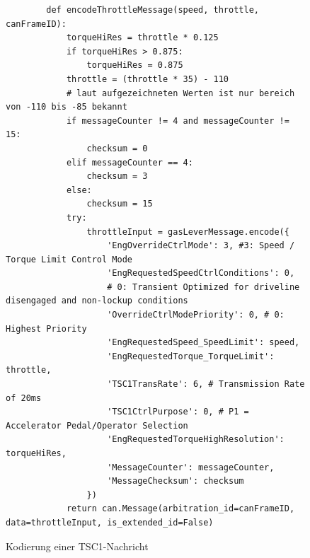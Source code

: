\begin{figure}[H]
    \begin{verbatim}
        def encodeThrottleMessage(speed, throttle, canFrameID):
            torqueHiRes = throttle * 0.125
            if torqueHiRes > 0.875:
                torqueHiRes = 0.875
            throttle = (throttle * 35) - 110 
            # laut aufgezeichneten Werten ist nur bereich von -110 bis -85 bekannt
            if messageCounter != 4 and messageCounter != 15: 
                checksum = 0
            elif messageCounter == 4:
                checksum = 3
            else:
                checksum = 15
            try:
                throttleInput = gasLeverMessage.encode({ 
                    'EngOverrideCtrlMode': 3, #3: Speed / Torque Limit Control Mode
                    'EngRequestedSpeedCtrlConditions': 0, 
                    # 0: Transient Optimized for driveline disengaged and non-lockup conditions
                    'OverrideCtrlModePriority': 0, # 0: Highest Priority
                    'EngRequestedSpeed_SpeedLimit': speed,
                    'EngRequestedTorque_TorqueLimit': throttle,
                    'TSC1TransRate': 6, # Transmission Rate of 20ms
                    'TSC1CtrlPurpose': 0, # P1 = Accelerator Pedal/Operator Selection
                    'EngRequestedTorqueHighResolution': torqueHiRes,
                    'MessageCounter': messageCounter,
                    'MessageChecksum': checksum
                })
            return can.Message(arbitration_id=canFrameID, data=throttleInput, is_extended_id=False)
    \end{verbatim}
    \caption{Kodierung einer TSC1-Nachricht}
    \label{fig:encodeThrottleMessage}
\end{figure}


